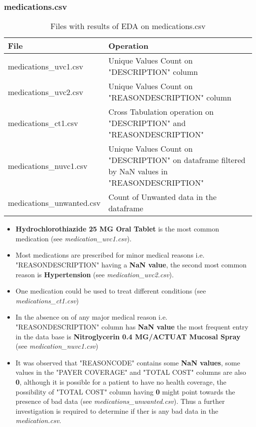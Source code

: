 \documentclass[12pt, twosided]{report}  %
\begin{document}
\subsubsection{medications.csv}


\begin{table}[H]
	\centering
	\begin{tabular}{p{4.5cm}|p{15cm}}
		\textbf{File} & \textbf{Operation} \\ \hline
		medications\_uvc1.csv     & Unique Values Count on "DESCRIPTION" column \\
		medications\_uvc2.csv     & Unique Values Count on "REASONDESCRIPTION" column \\
		medications\_ct1.csv      & Cross Tabulation operation on "DESCRIPTION" and "REASONDESCRIPTION" \\
		medications\_nuvc1.csv    & Unique Values Count on "DESCRIPTION" on dataframe filtered by NaN values in "REASONDESCRIPTION" \\
		medications\_unwanted.csv & Count of Unwanted data in the dataframe 
	\end{tabular}
	\caption{Files with results of EDA on medications.csv}
\end{table}


\begin{itemize}
	
	\item \textbf{Hydrochlorothiazide 25 MG Oral Tablet} is the most common medication (see \textit{medication\_uvc1.csv}).
	
	\item Most medications are prescribed for minor medical reasons i.e. "REASONDESCRIPTION" having a \textbf{NaN value}, the second most common reason is \textbf{Hypertension} (see \textit{medication\_uvc2.csv}).

	\item One medication could be used to treat different conditions (see \textit{medications\_ct1.csv})
	
	\item In the absence on of any major medical reason i.e. "REASONDESCRIPTION" column has \textbf{NaN value} the most frequent entry in the data base is \textbf{Nitroglycerin 0.4 MG/ACTUAT Mucosal Spray} (see \textit{medication\_nuvc1.csv})
	
	\item It was observed that "REASONCODE" contains some \textbf{NaN values}, some values in the "PAYER COVERAGE" and "TOTAL COST" columns are also \textbf{0}, although it is possible for a patient to have no health coverage, the possibility of "TOTAL COST" column having \textbf{0} might point towards the presence of bad data (see \textit{medications\_unwanted.csv}). Thus a further investigation is required to determine if ther is any bad data in the \textit{medication.csv}.
	
\end{itemize} 
\end{document}
